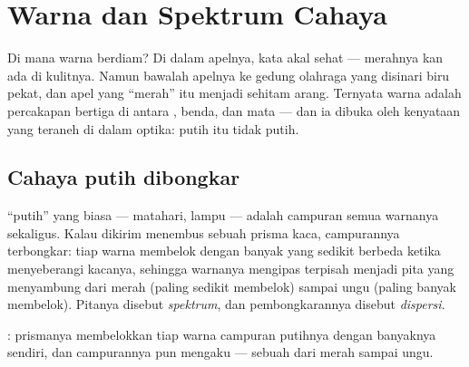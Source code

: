 \chapter{Warna dan Spektrum Cahaya}\label{ch:g8:colors-spectra}

Di mana warna berdiam? Di dalam apelnya, kata akal sehat --- merahnya
kan ada di kulitnya. Namun bawalah apelnya ke gedung olahraga yang
disinari biru pekat, dan apel yang ``merah'' itu menjadi sehitam
arang. Ternyata warna adalah percakapan bertiga di antara ,
benda, dan mata --- dan ia dibuka oleh kenyataan yang teraneh di dalam
optika:  putih itu tidak putih.

\section{Cahaya putih dibongkar}

\begin{proposition}\label{prop:g8:colors-spectra:mixture}
 ``putih'' yang biasa ---  matahari,  lampu ---
adalah campuran semua warnanya sekaligus. Kalau dikirim menembus
sebuah prisma kaca, campurannya terbongkar: tiap warna membelok dengan
banyak yang sedikit berbeda ketika menyeberangi kacanya, sehingga
warnanya mengipas terpisah menjadi pita yang menyambung dari merah
(paling sedikit membelok) sampai ungu (paling banyak membelok).
Pitanya disebut \emph{spektrum}, dan pembongkarannya
disebut \emph{dispersi}.
\end{proposition}

\begin{omfigure}

{\small {}: prismanya membelokkan tiap warna campuran putihnya
dengan banyaknya sendiri, dan campurannya pun mengaku --- sebuah
 dari merah sampai ungu.}
\end{omfigure}

